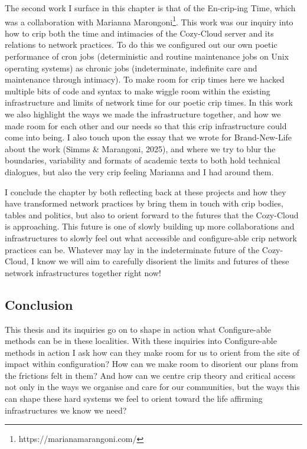 The second work I surface in this chapter is that of the En-crip-ing
Time, which was a collaboration with Marianna Marongoni\footnote{https://marianamarangoni.com/}.
This work was our inquiry into how to crip both the time and intimacies
of the Cozy-Cloud server and its relations to network practices. To do
this we configured out our own poetic performance of cron jobs
(deterministic and routine maintenance jobs on Unix operating systems)
as chronic jobs (indeterminate, indefinite care and maintenance through
intimacy). To make room for crip times here we hacked multiple bits of
code and syntax to make wiggle room within the existing infrastructure
and limits of network time for our poetic crip times. In this work we
also highlight the ways we made the infrastructure together, and how we
made room for each other and our needs so that this crip infrastructure
could come into being. I also touch upon the essay that we wrote for
Brand-New-Life about the work (Simms \& Marangoni, 2025), and where we
try to blur the boundaries, variability and formats of academic texts to
both hold technical dialogues, but also the very crip feeling Marianna
and I had around them.

I conclude the chapter by both reflecting back at these projects and how
they have transformed network practices by bring them in touch with crip
bodies, tables and politics, but also to orient forward to the futures
that the Cozy-Cloud is approaching. This future is one of slowly
building up more collaborations and infrastructures to slowly feel out
what accessible and configure-able crip network practices can be.
Whatever may lay in the indeterminate future of the Cozy-Cloud, I know
we will aim to carefully disorient the limits and futures of these
network infrastructures together right now!

\hypertarget{conclusion}{%
\subsection{Conclusion}\label{conclusion}}

This thesis and its inquiries go on to shape in action what
Configure-able methods can be in these localities. With these inquiries
into Configure-able methods in action I ask how can they make room for
us to orient from the site of impact within configuration? How can we
make room to disorient our plans from the frictions felt in them? And
how can we centre crip theory and critical access not only in the ways
we organise and care for our communities, but the ways this can shape
these hard systems we feel to orient toward the life affirming
infrastructures we know we need?
